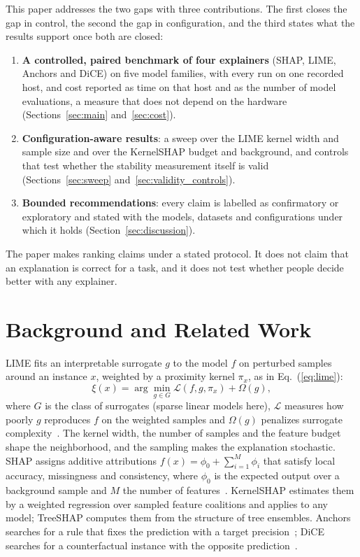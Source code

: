 \documentclass[11pt,a4paper]{article}
\begin{document}
This paper addresses the two gaps with three contributions. The first closes
the gap in control, the second the gap in configuration, and the third
states what the results support once both are closed:
\begin{enumerate}
\item \textbf{A controlled, paired benchmark of four explainers} (SHAP, LIME, Anchors and
DiCE) on five model families, with every run on one recorded host, and cost
reported as time on that host and as the number of model evaluations, a
measure that does not depend on the hardware (Sections~\ref{sec:main}
and~\ref{sec:cost}).
\item \textbf{Configuration-aware results}: a sweep over the LIME kernel
width and sample size and over the KernelSHAP budget and background, and
controls that test whether the stability measurement itself is valid
(Sections~\ref{sec:sweep} and~\ref{sec:validity_controls}).
\item \textbf{Bounded recommendations}: every claim is labelled as
confirmatory or exploratory and stated with the models, datasets and
configurations under which it holds (Section~\ref{sec:discussion}).
\end{enumerate}
The paper makes ranking claims under a stated protocol. It does not claim
that an explanation is correct for a task, and it does not test whether
people decide better with any explainer.

\section{Background and Related Work}
\label{sec:background}

LIME fits an interpretable surrogate $g$ to the model $f$ on perturbed
samples around an instance $x$, weighted by a proximity kernel $\pi_x$, as
in Eq.~(\ref{eq:lime}):
\begin{equation}
\xi(x) = \arg\min_{g \in G} \mathcal{L}(f, g, \pi_x) + \Omega(g),
\label{eq:lime}
\end{equation}
where $G$ is the class of surrogates (sparse linear models here),
$\mathcal{L}$ measures how poorly $g$ reproduces $f$ on the weighted
samples and $\Omega(g)$ penalizes surrogate complexity~\cite{ribeiro2016why}.
The kernel width, the number of samples and the feature budget shape the
neighborhood, and the sampling makes the explanation stochastic. SHAP
assigns additive attributions $f(x) = \phi_0 + \sum_{i=1}^{M} \phi_i$ that
satisfy local accuracy, missingness and consistency, where $\phi_0$ is the
expected output over a background sample and $M$ the number of
features~\cite{lundberg2017unified}. KernelSHAP estimates them by a
weighted regression over sampled feature coalitions and applies to any
model; TreeSHAP computes them from the structure of tree ensembles. Anchors
searches for a rule that fixes the prediction with a target
precision~\cite{ribeiro2018anchors}; DiCE searches for a counterfactual
instance with the opposite prediction~\cite{mothilal2020dice}.
\end{document}
